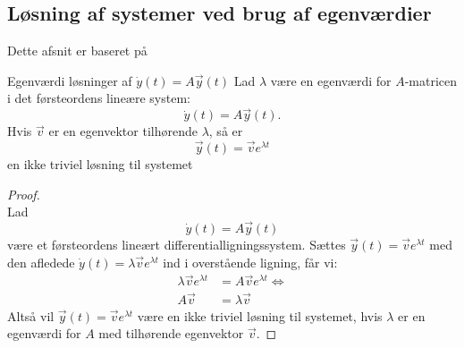 \subsection{Løsning af systemer ved brug af egenværdier}
Dette afsnit er baseret på \citep[afsnit 5.4]{EP}
\begin{mytheo}{Egenværdi løsninger af $\dot{y}(t) = A \vec{y}(t)$ }{}
Lad $\lambda$ være en egenværdi for $A$-matricen i det førsteordens lineære system:
$$\dot{y}(t) = A \vec{y}(t).$$
Hvis $\vec{v}$ er en egenvektor tilhørende $\lambda$, så er 
$$\vec{y}(t)=\vec{v}e^{\lambda t}$$
en ikke triviel løsning til systemet
\end{mytheo}
\begin{proof}\\
Lad 
$$\dot{y}(t) = A \vec{y}(t)$$
være et førsteordens lineært differentialligningssystem. Sættes $\vec{y}(t)=\vec{v}e^{\lambda t}$ med den afledede $\dot{y}(t)=\lambda \vec{v}e^{\lambda t}$ ind i overstående ligning, får vi:
\begin{equation*}
\begin{split}
    \lambda \vec{v}e^{\lambda t}&=A\vec{v}e^{\lambda t} \Leftrightarrow \\
    A\vec{v}&=\lambda \vec{v}
   \end{split}
\end{equation*}
Altså vil $\vec{y}(t)=\vec{v}e^{\lambda t}$ være en ikke triviel løsning til systemet, hvis $\lambda$ er en egenværdi for $A$ med tilhørende egenvektor $\vec{v}$.
\end{proof} \\

